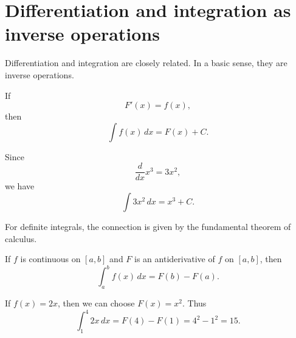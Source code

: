 \section{Differentiation and integration as inverse operations}

Differentiation and integration are closely related. In a basic sense, they are inverse operations.

If
\[
F'(x)=f(x),
\]
then
\[
\int f(x)\,dx=F(x)+C.
\]

\begin{examplebox}
Since
\[
\frac{d}{dx}x^3=3x^2,
\]
we have
\[
\int 3x^2\,dx=x^3+C.
\]
\end{examplebox}

For definite integrals, the connection is given by the fundamental theorem of calculus.

\begin{theorembox}
If \(f\) is continuous on \([a,b]\) and \(F\) is an antiderivative of \(f\) on \([a,b]\), then
\[
\int_a^b f(x)\,dx=F(b)-F(a).
\]
\end{theorembox}

\begin{examplebox}
If \(f(x)=2x\), then we can choose \(F(x)=x^2\). Thus
\[
\int_1^4 2x\,dx
=
F(4)-F(1)
=
4^2-1^2
=
15.
\]
\end{examplebox}
